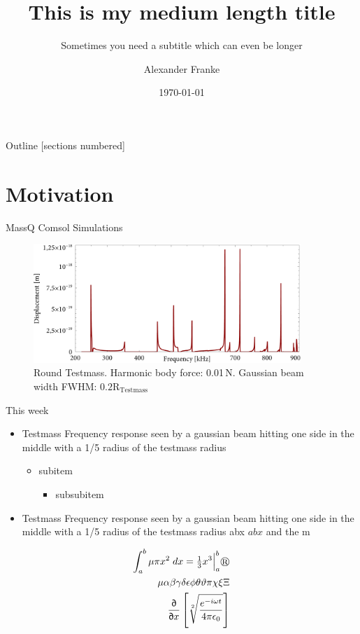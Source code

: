 \documentclass[10pt,aspectratio=1610,professionalfont]{beamer}
\title{This is my medium length title}
\subtitle{Sometimes you need a subtitle which can even be longer}
\author{Alexander Franke}
\date{\today}
\institute{Universität Hamburg\\Fachbereich Physik}
\renewcommand*\partial{\textsf{\reflectbox{6}}}
\begin{document}
\maketitle

\begin{frame}{Outline}
 [sections numbered]
  \tableofcontents
\end{frame}
\section{Motivation}
\begin{frame}{MassQ Comsol Simulations}
\begin{figure}[!htb]
\includegraphics[width=0.9\textwidth]{testmass_response.pdf}
\caption{Round \alert{Testmass}. Harmonic body force: 0.01\,N. Gaussian beam width FWHM: $0.2\text{R}_\text{Testmass}$}
\end{figure}
\end{frame}

\begin{frame}{This week}

\begin{multicols}{2}
\begin{itemize}
\item Testmass Frequency response seen by a gaussian beam hitting one side in the middle with a 1/5 radius of the testmass radius
\begin{itemize}
\item subitem
\begin{itemize}
\item subsubitem
\end{itemize}
\end{itemize}

\item Testmass   Frequency response seen by a gaussian beam hitting one side in the middle with a 1/5 radius of the testmass  radius abx $abx$ and the \textmu m

\end{itemize}
\begin{align}
 \int_a^b \mu\pi x^2\;dx= \tfrac{1}{3} x^3 \Big|_a^b \circledR \\
  \mu \alpha \beta \gamma \delta \epsilon \phi \theta \vartheta \pi \chi \xi \Xi \\
  \frac{\partial}{\partial x} \left[ \sqrt[2]{\frac{e^{-i\omega t}}{4 \pi \epsilon_0}} \right]
\end{align}
\end{multicols}
\end{frame}
\end{document}
